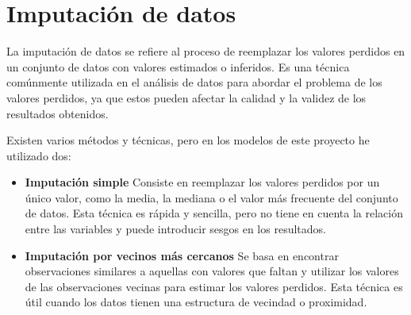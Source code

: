 \section{Imputación de datos} \label{imputadatos}
La imputación de datos se refiere al proceso de reemplazar los valores perdidos en un conjunto de datos con valores estimados o inferidos. Es una técnica comúnmente utilizada en el análisis de datos para abordar el problema de los valores perdidos, ya que estos pueden afectar la calidad y la validez de los resultados obtenidos.

Existen varios métodos y técnicas, pero en los modelos de este proyecto he utilizado dos:

\begin{itemize}
	\item \textbf{Imputación simple} Consiste en reemplazar los valores perdidos por un único valor, como la media, la mediana o el valor más frecuente del conjunto de datos. Esta técnica es rápida y sencilla, pero no tiene en cuenta la relación entre las variables y puede introducir sesgos en los resultados.
	\item \textbf{Imputación por vecinos más cercanos} Se basa en encontrar observaciones similares a aquellas con valores que faltan y utilizar los valores de las observaciones vecinas para estimar los valores perdidos. Esta técnica es útil cuando los datos tienen una estructura de vecindad o proximidad.
\end{itemize}